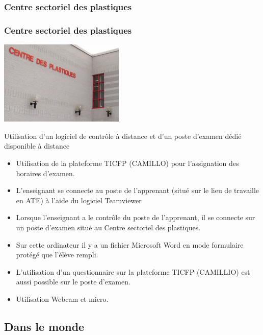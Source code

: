 \documentclass[aspectratio=169]{beamer}
\begin{document}
		\subsubsection{Centre sectoriel des plastiques} 
				\begin{frame}[allowframebreaks]
					\frametitle{Centre sectoriel des plastiques}
				 	\includegraphics [height=4cm]{plasturgie.png}				 	
				 	\framebreak
				 	\par Utilisation d’un logiciel de contrôle à distance et d’un poste d’examen dédié disponible à distance
				 	
				 	\begin {itemize}
						\item Utilisation de la plateforme TICFP (CAMILLO) pour l’assignation des horaires d’examen.
						\item L’enseignant se connecte au poste de l’apprenant (situé sur le lieu de travaille en ATE) à l’aide du logiciel Teamviewer
						\item Lorsque l’enseignant a le contrôle du poste de l’apprenant, il se connecte sur un poste d’examen situé au Centre sectoriel des plastiques.
						\item Sur cette ordinateur il y a un fichier Microsoft Word en mode formulaire protégé que l’élève rempli.
						\item L’utilisation d’un questionnaire sur la plateforme TICFP (CAMILLIO) est aussi possible sur le poste d’examen.
						\item Utilisation Webcam et micro.
					\end{itemize}
					
					
				\end{frame}
		
		\subsection{Dans le monde} 
						
\end{document}
